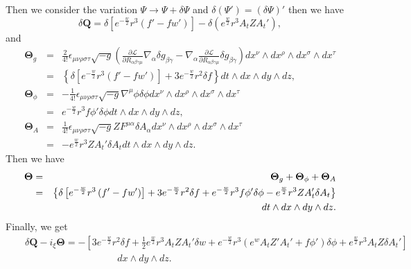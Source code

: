 \documentclass[a4paper,12pt]{article}
\numberwithin{equation}{section}
\begin{document}
Then we consider the variation $\Psi \rightarrow \Psi+\delta \Psi$ and $\delta \left(\Psi'\right)=\left(\delta\Psi\right)'$ then we have  
\begin{equation}
    \delta \mathbf{Q}=\delta\left[e^{-\frac{w}{2}}r^3 \left(  f'-fw' \right)   \right]-\delta\left( e^{\frac{w}{2}}r^3A_t Z A_t'\right),
\end{equation}
and
\begin{eqnarray}
    \mathbf{\Theta}_{g}&=&  \frac{2}{4!}\epsilon_{\mu\nu\rho\sigma\tau}\sqrt{-g}\left(\frac{\partial\mathcal{L}}{\partial R_{\alpha\beta\gamma\mu}}\nabla_\alpha \delta g_{\beta\gamma}-\nabla_\alpha \frac{\partial\mathcal{L}}{\partial R_{\alpha\beta\gamma\mu}}\delta g_{\beta\gamma}\right) dx^\nu \wedge dx^\rho \wedge dx^\sigma \wedge dx^\tau  \nonumber \\
    &=& \left\{\delta \left[e^{-\frac{w}{2}}r^3 \left(  f'-fw' \right)   \right]+3e^{-\frac{w}{2}}r^2\delta f \right\}dt\wedge dx\wedge dy\wedge dz ,  \\
    \mathbf{\Theta}_{\phi}&=&  -\frac{1}{4!}\epsilon_{\mu\nu\rho\sigma\tau}\sqrt{-g} \nabla^\mu\phi \delta\phi dx^\nu \wedge dx^\rho \wedge dx^\sigma \wedge dx^\tau \nonumber \\
    &=& e^{-\frac{w}{2}}r^3f\phi'\delta\phi dt\wedge dx\wedge dy\wedge dz , \\
    \mathbf{\Theta}_{A}&=& \frac{1}{4!}\epsilon_{\mu\nu\rho\sigma\tau}\sqrt{-g} Z F^{\mu\alpha}\delta A_\alpha dx^\nu \wedge dx^\rho \wedge dx^\sigma \wedge dx^\tau \nonumber \\
    &=&  - e^{\frac{w}{2}}r^3Z A_t' \delta A_t dt\wedge dx\wedge dy\wedge dz.
\end{eqnarray}
Then we have
\begin{eqnarray}
\mathbf{\Theta}&=&\mathbf{\Theta}_{g}+\mathbf{\Theta}_{\phi}+\mathbf{\Theta}_{A} \nonumber \\
    &=&\left\{\delta \left[e^{-\frac{w}{2}}r^3 \left(  f'-fw' \right)   \right]+3e^{-\frac{w}{2}}r^2\delta f+e^{-\frac{w}{2}}r^3f\phi'\delta\phi- e^{\frac{w}{2}}r^3Z A_t' \delta A_t \right\}  \nonumber \\
    && \hspace{5mm} dt\wedge dx\wedge dy\wedge dz.
\end{eqnarray}
Finally, we get 
\begin{eqnarray}
    &&\delta \mathbf{Q}-i_\xi \mathbf{\Theta} =-\left[3 e^{-\frac{w}{2}}r^2\delta f+\frac{1}{2}e^{\frac{w}{2}}r^3A_t Z A_t'\delta w +e^{-\frac{w}{2}}r^3 \left( e^w A_t Z'A_t'+f\phi' \right) \delta \phi+e^{\frac{w}{2}}r^3A_t Z\delta A_t'\right] \nonumber \\
    && \hspace{4cm} dx\wedge dy\wedge dz.
\end{eqnarray}
\end{document}
